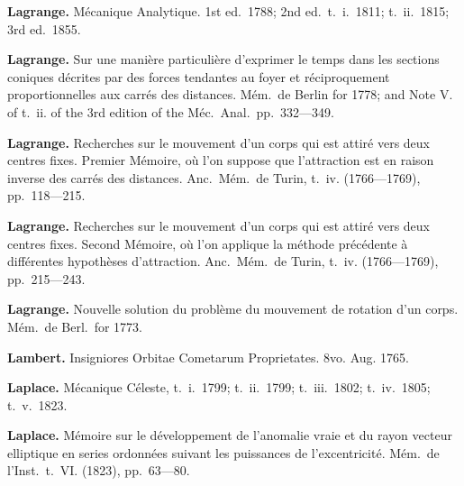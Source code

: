 \documentclass[11pt,a4paper]{book}
\begin{document}
\noindent\textbf{Lagrange.} M\'{e}canique Analytique. 1st ed.~1788; 2nd ed.~t.~i.~1811; t.~ii.~1815; 3rd ed.~1855.

\vspace{0.5em}

\noindent\textbf{Lagrange.} Sur une mani\`{e}re particuli\`{e}re d'exprimer le temps dans les sections coniques d\'{e}crites par des forces tendantes au foyer et r\'{e}ciproquement proportionnelles aux carr\'{e}s des distances. M\'{e}m.~de Berlin for 1778; and Note V. of t.~ii. of the 3rd edition of the M\'{e}c.~Anal.~pp.~332---349.

\vspace{0.5em}

\noindent\textbf{Lagrange.} Recherches sur le mouvement d'un corps qui est attir\'{e} vers deux centres fixes. Premier M\'{e}moire, o\`{u} l'on suppose que l'attraction est en raison inverse des carr\'{e}s des distances. Anc.~M\'{e}m.~de Turin, t.~iv. (1766---1769), pp.~118---215.

\vspace{0.5em}

\noindent\textbf{Lagrange.} Recherches sur le mouvement d'un corps qui est attir\'{e} vers deux centres fixes. Second M\'{e}moire, o\`{u} l'on applique la m\'{e}thode pr\'{e}c\'{e}dente \`{a} diff\'{e}rentes hypoth\`{e}ses d'attraction. Anc.~M\'{e}m.~de Turin, t.~iv. (1766---1769), pp.~215---243.

\vspace{0.5em}

\noindent\textbf{Lagrange.} Nouvelle solution du probl\`{e}me du mouvement de rotation d'un corps. M\'{e}m.~de Berl.~for 1773.

\vspace{0.5em}

\noindent\textbf{Lambert.} Insigniores Orbitae Cometarum Proprietates. 8vo. Aug. 1765.

\vspace{0.5em}

\noindent\textbf{Laplace.} M\'{e}canique C\'{e}leste, t.~i.~1799; t.~ii.~1799; t.~iii.~1802; t.~iv.~1805; t.~v.~1823.

\vspace{0.5em}

\noindent\textbf{Laplace.} M\'{e}moire sur le d\'{e}veloppement de l'anomalie vraie et du rayon vecteur elliptique en series ordonn\'{e}es suivant les puissances de l'excentricit\'{e}. M\'{e}m.~de l'Inst.~t.~VI. (1823), pp.~63---80.

\vspace{0.5em}
\end{document}
